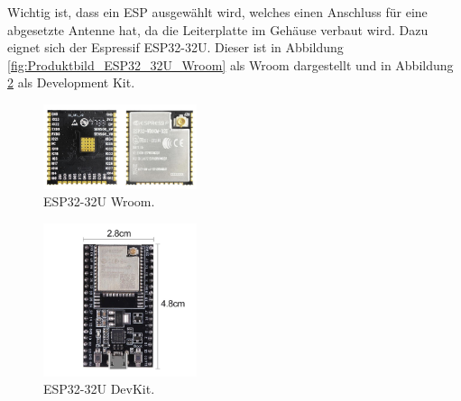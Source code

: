 Wichtig ist, dass ein ESP ausgewählt wird, welches einen Anschluss für eine abgesetzte Antenne hat, da die Leiterplatte im Gehäuse verbaut wird. Dazu eignet sich der Espressif ESP32-32U. Dieser ist in Abbildung \ref{fig:Produktbild_ESP32_32U_Wroom} als Wroom dargestellt und in Abbildung \ref{fig:Produktbild_ESP32_32U_DevKit} als Development Kit.

\begin{figure}[!h]
\center
\includegraphics[width = 0.4\textwidth]{graphics/Produktbild_ESP32}
\caption{ESP32-32U Wroom.}
\label{fig:Produktbild_USB_UART_ESP}
\end{figure}

\begin{figure}[!h]
\center
\includegraphics[width = 0.4\textwidth]{graphics/Produktbild_ESP32_2}
\caption{ESP32-32U DevKit.}
\label{fig:Produktbild_ESP32_32U_DevKit}
\end{figure}